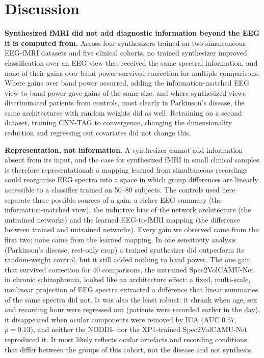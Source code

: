\documentclass[pdflatex,referee,sn-basic]{sn-jnl}%
\begin{document}
\section{Discussion}\label{section:discussion}

\noindent\textbf{Synthesized fMRI did not add diagnostic information beyond the EEG it is computed from.} Across four synthesizers trained on two simultaneous EEG-fMRI datasets and five clinical cohorts, no trained synthesizer improved classification over an EEG view that received the same spectral information, and none of their gains over band power survived correction for multiple comparisons. Where gains over band power occurred, adding the information-matched EEG view to band power gave gains of the same size, and where synthesized views discriminated patients from controls, most clearly in Parkinson's disease, the same architectures with random weights did as well. Retraining on a second dataset, training CNN-TAG to convergence, changing the dimensionality reduction and regressing out covariates did not change this.

\noindent\textbf{Representation, not information.} A synthesizer cannot add information absent from its input, and the case for synthesized fMRI in small clinical samples is therefore representational: a mapping learned from simultaneous recordings could reorganise EEG spectra into a space in which group differences are linearly accessible to a classifier trained on 50--80 subjects. The controls used here separate three possible sources of a gain: a richer EEG summary (the information-matched view), the inductive bias of the network architecture (the untrained networks) and the learned EEG-to-fMRI mapping (the difference between trained and untrained networks). Every gain we observed came from the first two; none came from the learned mapping. In one sensitivity analysis (Parkinson's disease, rest-only crop) a trained synthesizer did outperform its random-weight control, but it still added nothing to band power. The one gain that survived correction for 40 comparisons, the untrained Spec2VolCAMU-Net in chronic schizophrenia, looked like an architecture effect: a fixed, multi-scale, nonlinear projection of EEG spectra extracted a difference that linear summaries of the same spectra did not. It was also the least robust: it shrank when age, sex and recording hour were regressed out (patients were recorded earlier in the day), it disappeared when ocular components were removed by ICA (AUC $0.57$, $p=0.13$), and neither the NODDI- nor the XP1-trained Spec2VolCAMU-Net reproduced it. It most likely reflects ocular artefacts and recording conditions that differ between the groups of this cohort, not the disease and not synthesis.
\end{document}
